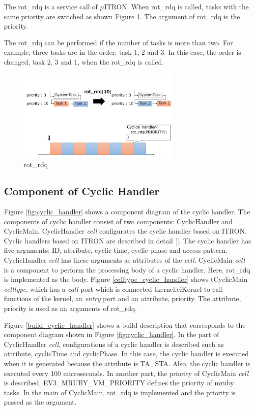 \documentclass[conference,compsoc]{IEEEtran}
\begin{document}
The rot\_rdq is a service call of $\mu$ITRON.
When rot\_rdq is called, tasks with the same priority are switched as shown Figure \ref{fig:rot_rdq}.
The argument of rot\_rdq is the priority.


The rot\_rdq can be performed if the number of tasks is more than two.
For example, three tasks are in the order: task 1, 2 and 3.
In this case, the order is changed, task 2, 3 and 1, when the rot\_rdq is called.

\begin{figure}[t]
    \centering
    \includegraphics[width=8cm,clip]{figure/rot_rdq.pdf}
    \caption{rot\_rdq}
    \label{fig:rot_rdq}
\end{figure}

\subsection{Component of Cyclic Handler}
Figure \ref{fig:cyclic_handler} shows a component diagram of the cyclic handler.
The components of cyclic handler consist of two components: CyclicHandler and CyclicMain.
CyclicHandler {\it cell} configurates the cyclic handler based on ITRON.
Cyclic handlers based on ITRON are described in detail [].
The cyclic handler has five arguments: ID, attribute, cyclic time, cyclic phase and access pattern.
CyclicHandler {\it cell} has these arguments as attributes of the {\it cell}.
CyclicMain {\it cell} is a component to perform the processing body of a cyclic handler.
Here, rot\_rdq is implemented as the body.
Figure \ref{celltype_cyclic_handler} shows tCyclicMain {\it celltype}, which has a {\it call} port which is connected tkernel.eiKernel to call functions of the kernel, an {\it entry} port and an attribute, priority.
The attribute, priority is used as an arguments of rot\_rdq.

Figure \ref{build_cyclic_handler} shows a build description that corresponds to the component diagram shown in Figure \ref{fig:cyclic_handler}.
In the part of CyclicHandler {\it cell}, configurations of a cyclic handler is described such as attribute, cyclicTime and cyclicPhase.
In this case, the cyclic handler is executed when it is generated because the attribute is TA\_STA.
Also, the cyclic handler is executed every 100 microseconds.
In another part, the priority of CyclicMain {\it cell} is described.
EV3\_MRUBY\_VM\_PRIORITY defines the priority of mruby tasks.
In the main of CyclicMain, rot\_rdq is implemented and the priority is passed as the argument.
\end{document}
